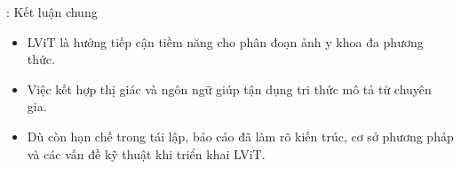 \begin{frame}{\secname: Kết luận chung}
\begin{itemize}
    \item LViT là hướng tiếp cận tiềm năng cho phân đoạn ảnh y khoa đa phương thức.
    \item Việc kết hợp thị giác và ngôn ngữ giúp tận dụng tri thức mô tả từ chuyên gia.
    \item Dù còn hạn chế trong tái lập, báo cáo đã làm rõ kiến trúc, cơ sở phương pháp và các vấn đề kỹ thuật khi triển khai LViT.
\end{itemize}
\end{frame}